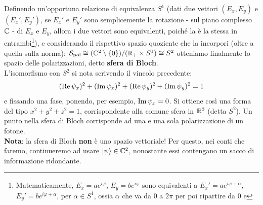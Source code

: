 \documentclass[FisicaTeorica.tex]{subfiles}
\begin{document}
Definendo un'opportuna relazione di equivalenza $S^1$ (dati due vettori $(E_x, E_y)$ e $(E_x', E_y')$, se $E_x'$ e $E_y'$ sono semplicemente la rotazione - sul piano complesso $\mathbb{C}$ - di $E_x$ e $E_y$, allora i due vettori sono equivalenti, poiché la  è la stessa in entrambi\footnote{Matematicamente, $E_x = a e^{i\varphi}$, $E_y = b e^{i\varphi}$ sono equivalenti a $E_x' = a e^{i\varphi + \alpha}$, $E_y' = b e^{i\varphi + \alpha}$, per $\alpha \in S^1$, ossia $\alpha$ che va da $0$ a $2\pi$ per poi ripartire da $0$ e }), e considerando il rispettivo spazio quoziente che la incorpori (oltre a quella sulla norma): $\mathcal{S}_{\text{pol}} \cong (\mathbb{C}^2 \setminus \{0\})/(\mathbb{R}_+ \times S^1) \cong S^2$ otteniamo finalmente lo spazio delle polarizzazioni, detto \textbf{sfera di Bloch}.\\
L'isomorfismo con $S^2$ si nota scrivendo il vincolo precedente:
\[
(\operatorname{Re}\psi_x)^2 + (\operatorname{Im}\psi_x)^2 + (\operatorname{Re}\psi_y)^2 + (\operatorname{Im}\psi_y)^2 = 1
\]
e fissando una fase, ponendo, per esempio, $\operatorname{Im} \psi_x = 0$. Si ottiene così una forma del tipo $x^2 + y^2 + z^2 = 1$, corrispondente alla comune sfera in $\mathbb{R}^3$ (detta $S^2$).
Un punto nella sfera di Bloch corrisponde ad una e una sola polarizzazione  di un fotone.\\
\textbf{Nota}: la sfera di Bloch \textbf{non} è uno spazio vettoriale! Per questo, nei conti che faremo, continueremo ad usare $\Ket{\psi} \in \mathbb{C}^2$, nonostante essi contengano un sacco di informazione ridondante.\\
\end{document}

